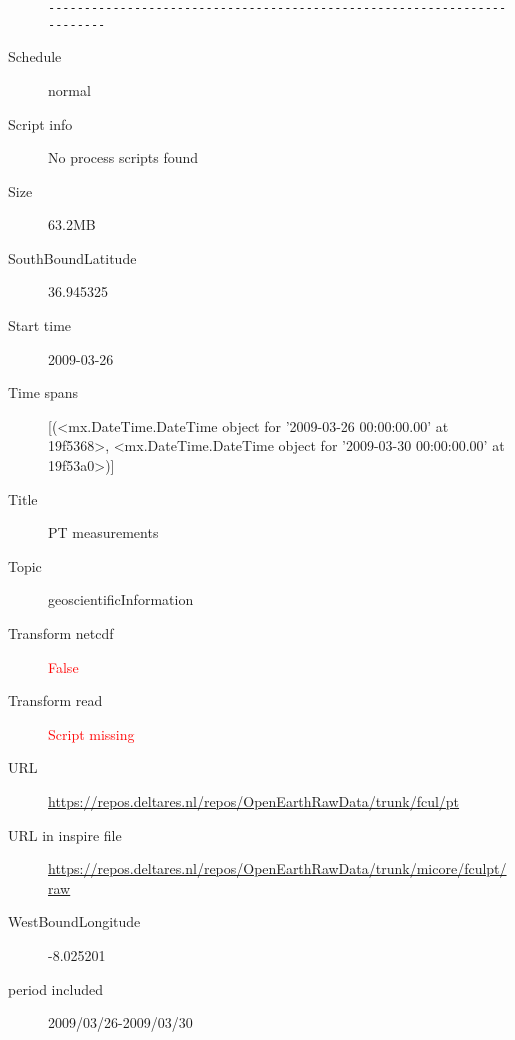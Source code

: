 \documentclass[9]{report}
\begin{document}
\begin{description}
\begin{verbatim}
------------------------------------------------------------------------

\end{verbatim}
  \item[Schedule] normal
  \item[Script info] No process scripts found
  \item[Size] 63.2MB
  \item[SouthBoundLatitude] 36.945325
  \item[Start time] 2009-03-26
  \item[Time spans] [(<mx.DateTime.DateTime object for '2009-03-26 00:00:00.00' at 19f5368>, <mx.DateTime.DateTime object for '2009-03-30 00:00:00.00' at 19f53a0>)]
  \item[Title]  PT measurements 
  \item[Topic] geoscientificInformation
  \item[Transform netcdf] \textcolor{red}{False}
  \item[Transform read] \textcolor{red}{Script missing}
  \item[URL] \href{https://repos.deltares.nl/repos/OpenEarthRawData/trunk/fcul/pt}{https://repos.deltares.nl/repos/OpenEarthRawData/trunk/fcul/pt}
  \item[URL in inspire file] \href{https://repos.deltares.nl/repos/OpenEarthRawData/trunk/micore/fculpt/raw}{https://repos.deltares.nl/repos/OpenEarthRawData/trunk/micore/fculpt/raw}
  \item[WestBoundLongitude] -8.025201
  \item[period included] 2009/03/26-2009/03/30
\end{description}
\end{document}
